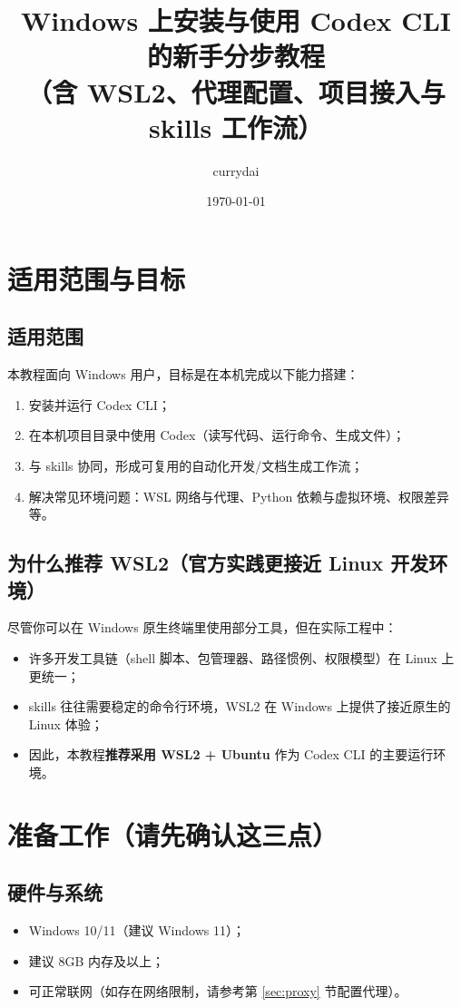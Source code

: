 \documentclass[11pt,a4paper]{article}
\title{Windows 上安装与使用 Codex CLI 的新手分步教程\\（含 WSL2、代理配置、项目接入与 skills 工作流）}
\author{currydai}
\date{\today}
\begin{document}
\maketitle
\newpage

\section{适用范围与目标}
\subsection{适用范围}
本教程面向 Windows 用户，目标是在本机完成以下能力搭建：
\begin{enumerate}[leftmargin=1.7em]
  \item 安装并运行 Codex CLI；
  \item 在本机项目目录中使用 Codex（读写代码、运行命令、生成文件）；
  \item 与 skills 协同，形成可复用的自动化开发/文档生成工作流；
  \item 解决常见环境问题：WSL 网络与代理、Python 依赖与虚拟环境、权限差异等。
\end{enumerate}

\subsection{为什么推荐 WSL2（官方实践更接近 Linux 开发环境）}
尽管你可以在 Windows 原生终端里使用部分工具，但在实际工程中：
\begin{itemize}[leftmargin=1.5em]
  \item 许多开发工具链（shell 脚本、包管理器、路径惯例、权限模型）在 Linux 上更统一；
  \item skills 往往需要稳定的命令行环境，WSL2 在 Windows 上提供了接近原生的 Linux 体验；
  \item 因此，本教程\textbf{推荐采用 WSL2 + Ubuntu} 作为 Codex CLI 的主要运行环境。
\end{itemize}

\section{准备工作（请先确认这三点）}
\subsection{硬件与系统}
\begin{itemize}[leftmargin=1.5em]
  \item Windows 10/11（建议 Windows 11）；
  \item 建议 8GB 内存及以上；
  \item 可正常联网（如存在网络限制，请参考第 \ref{sec:proxy} 节配置代理）。
\end{itemize}
\end{document}
